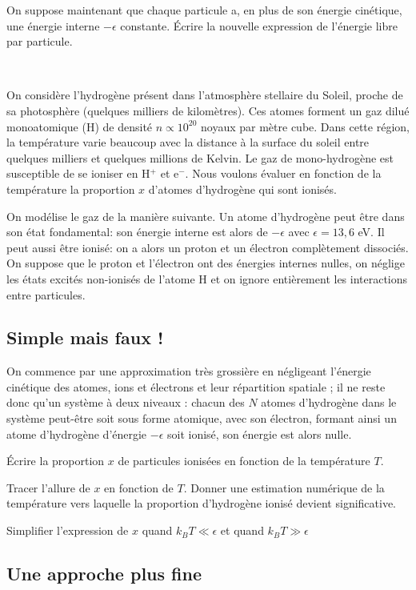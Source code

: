 \documentclass[utf8, 11pt]{feuille}
\begin{document}
\question On suppose maintenant que chaque particule a, en plus de son énergie cinétique, une énergie interne $-\epsilon$ constante. Écrire la nouvelle expression de l'énergie libre par particule.

\

On considère l’hydrogène présent dans l’atmosphère stellaire du Soleil, proche de sa photosphère (quelques milliers de kilomètres). Ces atomes forment un gaz dilué monoatomique (H) de densité $n \propto 10^{20}$ noyaux par mètre cube. Dans cette région, la température varie beaucoup avec la distance à la surface du soleil entre quelques milliers et quelques millions de Kelvin. Le gaz de mono-hydrogène est susceptible de se ioniser en H$^+$ et e$^-$. Nous voulons évaluer en fonction de la température la proportion $x$ d’atomes d’hydrogène qui sont ionisés.


On modélise le gaz de la manière suivante. Un atome d’hydrogène peut être dans son état fondamental: son énergie interne est alors de $-\epsilon$ avec $\epsilon = 13,6$ eV. Il peut aussi être ionisé: on a alors un proton et
un électron complètement dissociés. On suppose que le proton et l’électron ont des énergies internes nulles, on néglige les états excités non-ionisés de l’atome H et on ignore entièrement les interactions entre particules.

\subsection{Simple mais faux !}

On commence par une approximation très grossière en négligeant l’énergie cinétique des atomes, ions et électrons et leur répartition spatiale ; il ne reste donc qu'un
système à deux niveaux : chacun des $N$ atomes d’hydrogène dans le système peut-être soit sous forme atomique, avec son électron, formant ainsi un atome d’hydrogène d’énergie $-\epsilon$ soit ionisé, son énergie est alors nulle.

\question Écrire la proportion $x$ de particules ionisées en fonction de la température $T$.

 \question Tracer l’allure de $x$ en fonction de $T$. Donner une estimation numérique de la température vers laquelle la proportion d'hydrogène ionisé devient significative.

\question Simplifier l’expression de $x$ quand $k_B T \ll \epsilon $ et quand $k_B T \gg \epsilon $

\subsection{Une approche plus fine }
\end{document}

